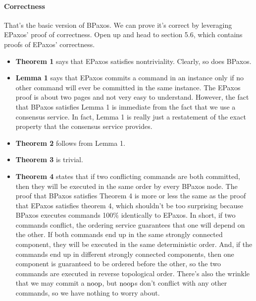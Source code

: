 \documentclass{mwhittaker}
\begin{document}
\paragraph{Correctness}
That's the basic version of BPaxos. We can prove it's correct by leveraging
EPaxos' proof of correctness. Open up \cite{moraru2013proof} and head to
section 5.6, which contains proofs of EPaxos' correctness.
\begin{itemize}
  \item
    \textbf{Theorem 1} says that EPaxos satisfies nontriviality. Clearly, so
    does BPaxos.

  \item
    \textbf{Lemma 1} says that EPaxos commits a command in an instance only if
    no other command will ever be committed in the same instance. The EPaxos
    proof is about two pages and not very easy to understand. However, the fact
    that BPaxos satisfies Lemma 1 is immediate from the fact that we use a
    consensus service. In fact, Lemma 1 is really just a restatement of the
    exact property that the consensus service provides.

  \item
    \textbf{Theorem 2} follows from Lemma 1.

  \item
    \textbf{Theorem 3} is trivial.

  \item
    \textbf{Theorem 4} states that if two conflicting commands are both
    committed, then they will be executed in the same order by every BPaxos
    node. The proof that BPaxos satisfies Theorem 4 is more or less the same as
    the proof that EPaxos satisfies theorem 4, which shouldn't be too
    surprising because BPaxos executes commands 100\% identically to EPaxos. In
    short, if two commands conflict, the ordering service guarantees that one
    will depend on the other. If both commands end up in the same strongly
    connected component, they will be executed in the same deterministic order.
    And, if the commands end up in different strongly connected components,
    then one component is guaranteed to be ordered before the other, so the two
    commands are executed in reverse topological order. There's also the
    wrinkle that we may commit a $\text{noop}$, but $\text{noop}$s don't conflict with any
    other commands, so we have nothing to worry about.
\end{itemize}
\end{document}
